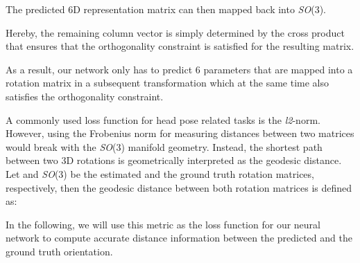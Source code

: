 \documentclass{article}
\begin{document}
The predicted 6D representation matrix can then mapped back into \textit{SO}(3).



Hereby, the remaining column vector is simply determined by the cross product that ensures that the orthogonality constraint is satisfied for the resulting  matrix.


As a result, our network only has to predict 6 parameters that are mapped into a  rotation matrix in a subsequent transformation which at the same time also satisfies the orthogonality constraint.

A commonly used loss function for head pose related tasks is the \textit{l2}-norm. However, using the Frobenius norm for measuring distances between two matrices would break with the \textit{SO}(3) manifold geometry. Instead, the shortest path between two 3D rotations is geometrically interpreted as the geodesic distance. Let  and   \textit{SO}(3) be the estimated and the ground truth rotation matrices, respectively, then the geodesic distance between both rotation matrices is defined as:



In the following, we will use this metric as the loss function for our neural network to compute accurate distance information between the predicted and the ground truth orientation.
\end{document}
